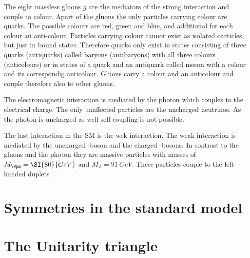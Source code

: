 The eight massless gluons $g$ are the mediators of the strong interaction and couple to colour. Apart of the gluons
the only particles carrying colour are quarks. The possible colours are red, green and blue, and additional for each colour an anti-colour.
Particles carrying colour cannot exist as isolated oarticles, but just in bound states. Therefore quarks only exist in states consisting
of three quarks (antiquarks) called baryons (antibaryons) with all three colours (anticolours) or in states of a quark and an antiquark
called meson with a colour and its correspondig anticolour. Gluons carry a colour and an anticolour and couple therefore also to other
gluons.

The electromagnetic interaction is mediated by the photon \g which couples to the electrical charge. The only unaffected particles
are the uncharged neutrinos. As the photon is uncharged as well self-coupling is not possible.

The last interaction in the \ac{SM} is the wek interaction. The weak interaction is mediated by the uncharged \Z-boson and the charged
\Wpm-bosons. In contrast to the gluons and the photon they are massive particles with masses of $M_\Wpm=\SI{80}{GeV}$ and $M_Z=\SI{91}{GeV}$.
These particles couple to the left-handed duplets

\section{Symmetries in the standard model}

\Blindtext

\section{The Unitarity triangle}

\Blindtext

